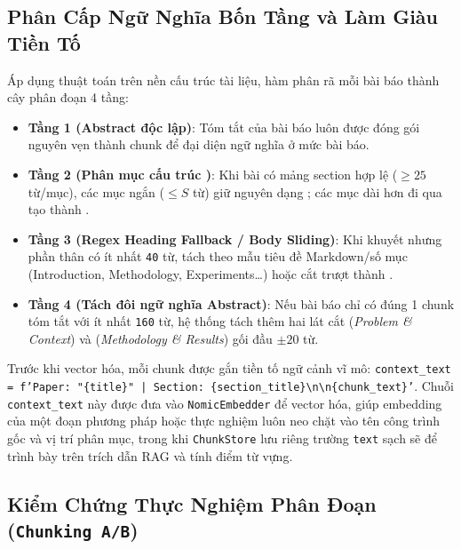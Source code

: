 \subsection{Phân Cấp Ngữ Nghĩa Bốn Tầng và Làm Giàu Tiền Tố}
\label{sec:ch2_chunker_hierarchy}

Áp dụng thuật toán  trên nền cấu trúc tài liệu, hàm  phân rã mỗi bài báo thành cây phân đoạn 4 tầng:
\begin{itemize}
  \item \textbf{Tầng 1 (Abstract độc lập)}: Tóm tắt của bài báo luôn được đóng gói nguyên vẹn thành chunk  để đại diện ngữ nghĩa ở mức bài báo.
  \item \textbf{Tầng 2 (Phân mục cấu trúc )}: Khi bài có mảng section hợp lệ ($\ge 25$ từ/mục), các mục ngắn ($\le S$ từ) giữ nguyên dạng ; các mục dài hơn đi qua  tạo thành .
  \item \textbf{Tầng 3 (Regex Heading Fallback / Body Sliding)}: Khi khuyết  nhưng phần thân có ít nhất \texttt{40} từ, tách theo mẫu tiêu đề Markdown/số mục (Introduction, Methodology, Experiments\ldots) hoặc cắt trượt thành .
  \item \textbf{Tầng 4 (Tách đôi ngữ nghĩa Abstract)}: Nếu bài báo chỉ có đúng 1 chunk tóm tắt với ít nhất \texttt{160} từ, hệ thống tách thêm hai lát cắt  (\textit{Problem \& Context}) và  (\textit{Methodology \& Results}) gối đầu $\pm 20$ từ.
\end{itemize}

Trước khi vector hóa, mỗi chunk được gắn tiền tố ngữ cảnh vĩ mô: \texttt{context\_text = f'Paper: "\{title\}" | Section: \{section\_title\}\textbackslash n\textbackslash n\{chunk\_text\}'}. Chuỗi \texttt{context\_text} này được đưa vào \texttt{NomicEmbedder} để vector hóa, giúp embedding của một đoạn phương pháp hoặc thực nghiệm luôn neo chặt vào tên công trình gốc và vị trí phân mục, trong khi \texttt{ChunkStore} lưu riêng trường \texttt{text} sạch sẽ để trình bày trên trích dẫn RAG và tính điểm từ vựng.

\subsection{Kiểm Chứng Thực Nghiệm Phân Đoạn (\texttt{Chunking A/B})}
\label{sec:ch2_chunking_ab}


